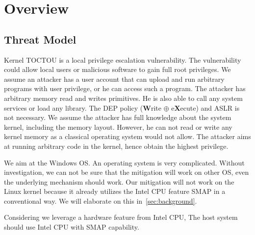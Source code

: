 \section{Overview}
\label{sec:overview}

\subsection{Threat Model}
\label{sec:threatmodel}

Kernel TOCTOU is a local privilege escalation vulnerability. The vulnerability could allow local users or malicious software to gain full root privileges. We assume an attacker has a user account that can upload and run arbitrary programs with user privilege, or he can access such a program. The attacker has arbitrary memory read and writes primitives. He is also able to call any system services or load any library. The DEP policy (\textbf{W}rite $\oplus$ e\textbf{X}ecute) and ASLR is not necessary. We assume the attacker has full knowledge about the system kernel, including the memory layout. However, he can not read or write any kernel memory as a classical operating system would not allow. The attacker aims at running arbitrary code in the kernel, hence obtain the highest privilege. 

We aim at the Windows OS. An operating system is very complicated. Without investigation,  we can not be sure that the mitigation will work on other OS, even the underlying mechanism should work. Our mitigation will not work on the Linux kernel because it already utilizes the Intel CPU feature SMAP in a conventional way. We will elaborate on this in~\autoref{sec:background}.

Considering we leverage a hardware feature from Intel CPU, The host system should use Intel CPU with SMAP capability.
